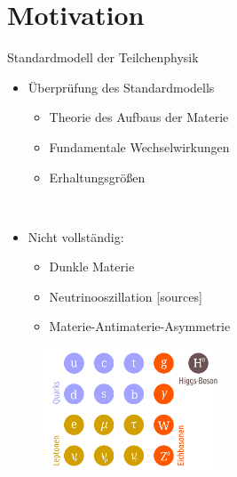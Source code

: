 \section{Motivation}
\begin{frame}[t]{Standardmodell der Teilchenphysik}
  \begin{multicols}{2}
      \begin{itemize}
        \item Überprüfung des Standardmodells
        \begin{itemize}
          \item Theorie des Aufbaus der Materie
          \item Fundamentale Wechselwirkungen
          \item Erhaltungsgrößen
        \end{itemize}
      \end{itemize}
      \ \\
      \begin{itemize}
        \item Nicht vollständig:
        \begin{itemize}
          \item Dunkle Materie
          \item Neutrinooszillation [sources]
          \item Materie-Antimaterie-Asymmetrie
        \end{itemize}
      \end{itemize}
      \columnbreak
      \begin{figure}
        \centering
        \includegraphics[width=0.47\textwidth]{SM.png}
      \end{figure}
  \end{multicols}
\end{frame}

